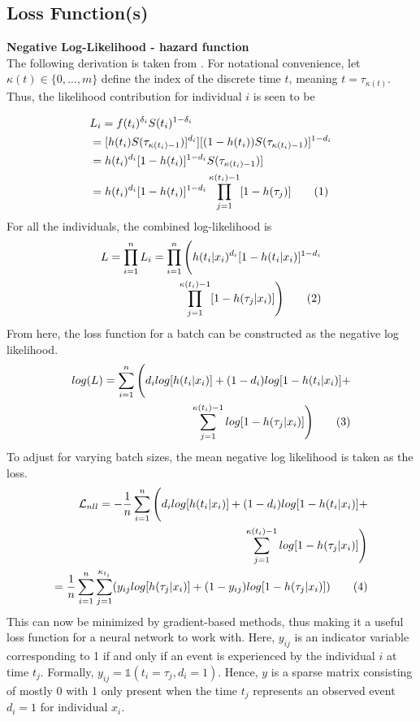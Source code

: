 \documentclass[%
 twocolumn,
 reprint,
 amsmath,amssymb,
 aps,nofootinbib
]{revtex4-2}
\newcommand\numberthis{\addtocounter{equation}{1}\tag{\theequation}} %
\begin{document}
\subsection{\label{app:loss}Loss Function(s)}
\textbf{Negative Log-Likelihood - hazard function}\\
The following derivation is taken from \cite{kvamme_continuous_2019}. For notational convenience, let $\kappa(t) \in \{0, \ldots , m\}$ define the index of the discrete time $t$, meaning $t = \tau_{\kappa(t)}$. Thus, the likelihood contribution for individual $i$ is seen to be 

\begin{align*}
&L_i = f(t_i)^{\delta_i}S(t_i)^{1-\delta_i}\\
&= [h(t_i)S(\tau_{\kappa(t_i)-1})]^{d_i}][(1-h(t_i))S(\tau_{\kappa(t_i)-1})]^{1-d_i}\\
&= h(t_i)^{d_i}[1 - h(t_i)]^{1-d_i}S(\tau_{\kappa(t_i)-1})]\\
&= h(t_i)^{d_i}[1 - h(t_i)]^{1-d_i} \prod^{\kappa(t_i)-1}_{j=1}[1 - h(\tau_j)] \numberthis  \label{eq:ll_contribution}
\end{align*}
For all the individuals, the combined log-likelihood is
\begin{align*}
L = \prod^{n}_{i=1}L_i = \prod^{n}_{i=1}\Bigg(h(t_i|x_i)^{d_i}[1 - h(t_i|x_i)]^{1-d_i} \\
\prod^{\kappa(t_i)-1}_{j=1}[1 - h(\tau_j|x_i)]\Bigg) \numberthis  \label{eq:ll}
\end{align*}
From here, the loss function for a batch can be constructed as the negative log likelihood.
\begin{align*}
log(L) = \sum^{n}_{i=1}\Bigg(d_i log[h(t_i|x_i)]+(1-d_i)log[1-h(t_i|x_i)]+\\
\sum^{\kappa(t_i)-1}_{j=1}log[1 - h(\tau_j|x_i)] \Bigg) \numberthis  \label{eq:logll}
\end{align*}
To adjust for varying batch sizes, the mean negative log likelihood is taken as the loss.
\begin{align*}
\mathcal{L}_{nll} = -\frac{1}{n}\sum^{n}_{i=1}\Bigg(d_i log[h(t_i|x_i)]+(1-d_i)log[1-h(t_i|x_i)]+\\
\sum^{\kappa(t_i)-1}_{j=1} log[1 - h(\tau_j|x_i)] \Bigg) \\
= \frac{1}{n}\sum^{n}_{i=1}\sum^{\kappa_{t_i}}_{j=1}(y_{ij}log[h(\tau_j|x_i)]+(1-y_{ij})log[1-h(\tau_j|x_i)]) \numberthis  \label{eq:nll}
\end{align*}
This can now be minimized by gradient-based methods, thus making it a useful loss function for a neural network to work with. Here, $y_{ij}$ is an indicator variable corresponding to 1 if and only if an event is experienced by the individual $i$ at time $t_j$. Formally, $y_{ij} = \mathds{1}(t_i = \tau_j , d_i = 1)$. Hence, $y$ is a sparse matrix consisting of mostly 0 with 1 only present when the time $t_j$ represents an observed event $d_i = 1$ for individual $x_i$. \\
\end{document}

